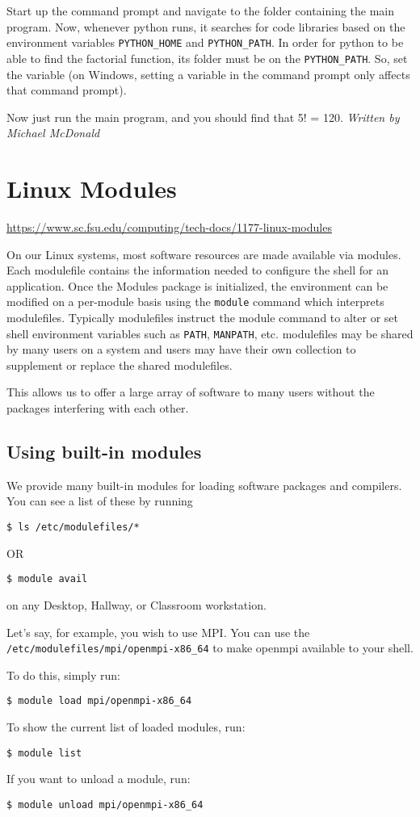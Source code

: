 \documentclass[12pt,a4paper]{article}
\begin{document}
Start up the command prompt and navigate to the folder containing the main program. Now, whenever python runs, it searches for code libraries based on the environment variables \texttt{PYTHON\_HOME} and \texttt{PYTHON\_PATH}. In order for python to be able to find the factorial function, its folder must be on the \texttt{PYTHON\_PATH}. So, set the variable (on Windows, setting a variable in the command prompt only affects that command prompt).

Now just run the main program, and you should find that 5! = 120.
\hfill \textit{Written by Michael McDonald}

\section{Linux Modules}
\url{https://www.sc.fsu.edu/computing/tech-docs/1177-linux-modules}

On our Linux systems, most software resources are made available via modules. Each modulefile contains the information needed to configure the shell for an application. Once the Modules package is initialized, the environment can be modified on a per-module basis using the \texttt{module} command which interprets modulefiles. Typically modulefiles instruct the module command to alter or set shell environment variables such as \texttt{PATH}, \texttt{MANPATH}, etc. modulefiles may be shared by many users on a system and users may have their own collection to supplement or replace the shared modulefiles.

This allows us to offer a large array of software to many users without the packages interfering with each other.

\subsection*{Using built-in modules}
We provide many built-in modules for loading software packages and compilers. You can see a list of these by running
\begin{verbatim}
$ ls /etc/modulefiles/*
\end{verbatim}
OR
\begin{verbatim}
$ module avail
\end{verbatim}
on any Desktop, Hallway, or Classroom workstation.

Let's say, for example, you wish to use MPI. You can use the \texttt{/etc/modulefiles/mpi/openmpi-x86\_64} to make openmpi available to your shell.

To do this, simply run:
\begin{verbatim}
$ module load mpi/openmpi-x86_64
\end{verbatim}
To show the current list of loaded modules, run:
\begin{verbatim}
$ module list
\end{verbatim}
If you want to unload a module, run:
\begin{verbatim}
$ module unload mpi/openmpi-x86_64
\end{verbatim}
\end{document}
